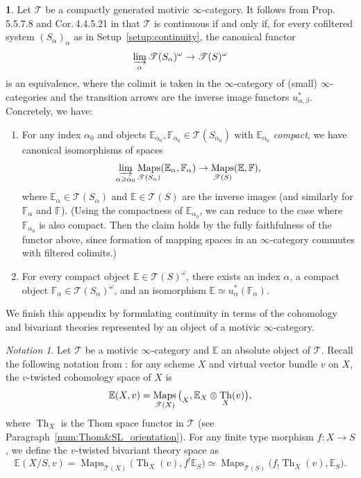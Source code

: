 \documentclass[11pt]{article}
\makeatletter
\numberwithin{equation}{section}\renewcommand{\encodingdefault}{TU}
\DeclareRobustCommand{\mathbbm}[1]{\csname jepbb@#1\endcsname}
\newcommand{\T}{\mathscr T}
\newcommand{\E}{\mathbb E}
\newcommand{\F}{\mathbb F}
\newcommand{\un}{\mathbbm 1}
\DeclareMathOperator{\Maps}{Maps}
\DeclareMathOperator{\ilim}{\varinjlim}
\DeclareMathOperator{\Th}{Th}
\theoremstyle{remark}
\newtheorem{notation}[thm]{Notation}
\theoremstyle{definition}
\newtheorem{num}[thm]{}
\numberwithin{equation}{thm}
\makeatother
\begin{document}
\begin{num}\label{num:continuity compact}
Let $\T$ be a compactly generated motivic $\infty$-category.
It follows from Prop.\,5.5.7.8 and Cor.\,4.4.5.21 in \cite{LurieHTT} that $\T$ is continuous if and only if, for every cofiltered system $(S_\alpha)_\alpha$ as in Setup~\ref{setup:continuity}, the canonical functor
\[
\ilim_\alpha \T(S_\alpha)^\omega \to \T(S)^\omega
\]
is an equivalence, where the colimit is taken in the $\infty$-category of (small) $\infty$-categories and the transition arrows are the inverse image functors $u_{\alpha,\beta}^*$.
Concretely, we have:
\begin{enumerate}
\item\label{item:continuity compact maps}
For any index $\alpha_0$ and objects $\E_{\alpha_0},\F_{\alpha_0} \in \T(S_{\alpha_0})$ with $\E_{\alpha_0}$ \emph{compact}, we have canonical isomorphisms of spaces
\begin{equation*}
\ilim_{\alpha\geqslant\alpha_0} \Maps_{\T(S_\alpha)}(\E_\alpha, \F_\alpha)
\to \Maps_{\T(S)}(\E, \F),
\end{equation*}
where $\E_\alpha \in \T(S_\alpha)$ and $\E \in \T(S)$ are the inverse images (and similarly for $\F_\alpha$ and $\F$).
(Using the compactness of $\E_{\alpha_0}$, we can reduce to the case where $\F_{\alpha_0}$ is also compact.
Then the claim holds by the fully faithfulness of the functor above, since formation of mapping spaces in an $\infty$-category commutes with filtered colimits.)

\item
For every compact object $\E \in \T(S)^\omega$, there exists an index $\alpha$, a compact object $\F_\alpha \in \T(S_\alpha)^\omega$, and an isomorphism $\E \simeq u_\alpha^*(\F_\alpha)$.
\end{enumerate}
\end{num}

We finish this appendix by formulating continuity in terms of the cohomology and bivariant theories represented by an object of a motivic $\infty$-category.

\begin{notation}\label{notation:cohomology+bivariant}
Let $\T$ be a motivic $\infty$-category and $\E$ an absolute object of $\T$.
Recall the following notation from \cite[Def.\,2.2.1]{DJK}: for any scheme $X$ and virtual vector bundle $v$ on $X$, the $v$-twisted cohomology space of $X$ is
\[
\E(X, v) = \Maps_{\T(X)}\big( \un_X, \E_X \otimes \Th_X(v) \big),
\]
where $\Th_X$ is the Thom space functor in $\T$ (see Paragraph~\ref{num:Thom&SL_orientation}).
For any finite type morphism $f : X \to S$, we define the $v$-twisted bivariant theory space as
\[
\E(X/S, v)
= \Maps_{\T(X)}\big( \Th_X(v), f^!\E_S \big)
\simeq \Maps_{\T(S)}\big( f_!\Th_X(v), \E_S \big).
\]
\end{notation}
\end{document}
